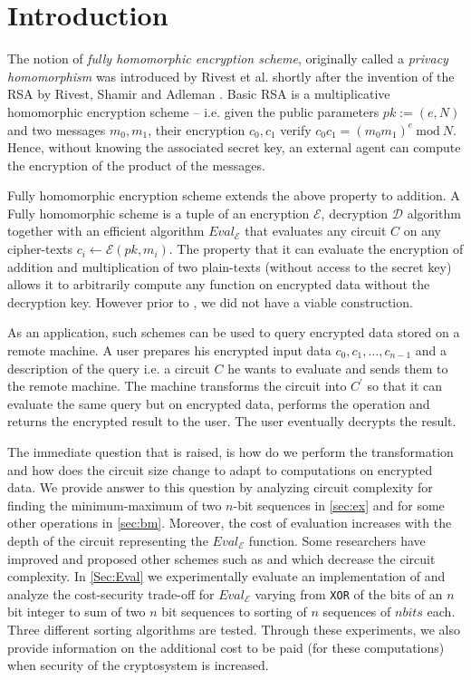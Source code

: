 \documentclass{acm_proc_article-sp}
\begin{document}

\section{Introduction}

The notion of \textit{fully homomorphic encryption scheme}, originally called a \textit{privacy homomorphism} was introduced by Rivest et al. \cite{rivest78} shortly after the invention of the RSA by Rivest, Shamir and Adleman \cite{Rivest78amethod}.  Basic RSA is a multiplicative homomorphic encryption scheme -- i.e. given the public parameters $pk:=(e, N)$ and two messages $m_0, m_1$, their encryption $c_0, c_1$ verify $c_0c_1=(m_0m_1)^e \ \textrm {mod}\ N$. Hence, without knowing the associated secret key, an external agent can compute the encryption of the product of the messages.

Fully homomorphic encryption scheme extends the above property to addition. A Fully homomorphic scheme is a tuple of an encryption $\mathcal{E}$, decryption $\mathcal{D}$ algorithm together with an efficient algorithm $Eval_\mathcal{E}$ that evaluates any circuit $C$ on any cipher-texts $c_i \leftarrow \mathcal{E}(pk, m_i)$. The property that it can evaluate the encryption of addition and multiplication of two plain-texts (without access to the secret key) allows it to arbitrarily compute any function on encrypted data without the decryption key. However prior to \cite{homenc}, we did not have a viable construction.

As an application, such schemes can be used to query encrypted data stored on a remote machine. A user prepares his encrypted input data $c_0, c_1, \ldots, c_{n-1}$  and a description of the query i.e. a circuit $C$ he wants to evaluate and sends them to the remote machine. The machine transforms the circuit into $C^{'}$ so that it can evaluate the same query but on encrypted data, performs the operation and returns the encrypted result to the user. The user eventually decrypts the result. 

The immediate question that is raised, is how do we perform the transformation and how does the circuit size change to adapt to computations on encrypted data. We provide answer to this question by analyzing circuit complexity for finding the minimum-maximum of two $n$-bit sequences in \autoref{sec:ex} and for some other operations in \autoref{sec:bm}. Moreover, the cost of evaluation increases with the depth of the circuit representing the $Eval_{\mathcal{E}}$ function. Some researchers have improved and proposed other schemes such as \cite{cryptoeprint:2009:571} and \cite{cryptoeprint:2011:277} which decrease the circuit complexity. In \autoref{Sec:Eval} we experimentally evaluate an implementation of  \cite{cryptoeprint:2009:571} and analyze the cost-security trade-off for $Eval_{\mathcal{E}}$ varying from \texttt{XOR} of the bits of an $n$ bit integer to sum of two $n$ bit sequences to sorting of $n$ sequences of $nbits$ each. Three different sorting algorithms are tested.  
Through these experiments, we also provide information on the additional cost to be paid (for these computations) when security of the cryptosystem is increased.
\end{document}

